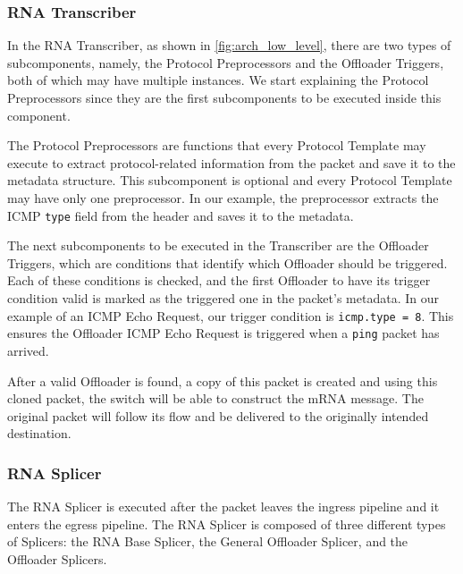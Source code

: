 \subsubsection*{RNA Transcriber}

In the RNA Transcriber, as shown in \autoref{fig:arch_low_level}, there are two types of subcomponents, namely, the Protocol Preprocessors and the Offloader Triggers, both of which may have multiple instances. We start explaining the Protocol Preprocessors since they are the first subcomponents to be executed inside this component.

The Protocol Preprocessors are functions that every Protocol Template may execute to extract protocol-related information from the packet and save it to the metadata structure. This subcomponent is optional and every Protocol Template may have only one preprocessor. In our example, the preprocessor extracts the ICMP \texttt{type} field from the header and saves it to the metadata.

The next subcomponents to be executed in the Transcriber are the Offloader Triggers, which are conditions that identify which Offloader should be triggered. Each of these conditions is checked, and the first Offloader to have its trigger condition valid is marked as the triggered one in the packet's metadata. In our example of an ICMP Echo Request, our trigger condition is \texttt{icmp.type = 8}. This ensures the Offloader ICMP Echo Request is triggered when a \texttt{ping} packet has arrived.


After a valid Offloader is found, a copy of this packet is created and using this cloned packet, the switch will be able to construct the mRNA message. The original packet will follow its flow and be delivered to the originally intended destination.

\subsubsection*{RNA Splicer}

The RNA Splicer is executed after the packet leaves the ingress pipeline and it enters the egress pipeline\footnotemark{}. The RNA Splicer is composed of three different types of Splicers: the RNA Base Splicer, the General Offloader Splicer, and the Offloader Splicers.


